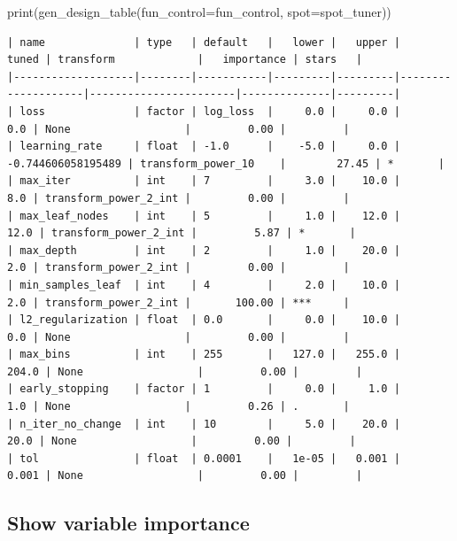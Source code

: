 \documentclass[
  letterpaper,
  DIV=11,
  numbers=noendperiod]{scrreprt}
\newenvironment{Shaded}{\begin{snugshade}}{\end{snugshade}}
\newcommand{\BuiltInTok}[1]{\textcolor[rgb]{0.00,0.23,0.31}{#1}}
\newcommand{\NormalTok}[1]{\textcolor[rgb]{0.00,0.23,0.31}{#1}}
\newcommand{\OperatorTok}[1]{\textcolor[rgb]{0.37,0.37,0.37}{#1}}
\begin{document}
\begin{Shaded}
\begin{Highlighting}[]
\BuiltInTok{print}\NormalTok{(gen\_design\_table(fun\_control}\OperatorTok{=}\NormalTok{fun\_control,}
\NormalTok{    spot}\OperatorTok{=}\NormalTok{spot\_tuner))}
\end{Highlighting}
\end{Shaded}

\begin{verbatim}
| name              | type   | default   |   lower |   upper |              tuned | transform             |   importance | stars   |
|-------------------|--------|-----------|---------|---------|--------------------|-----------------------|--------------|---------|
| loss              | factor | log_loss  |     0.0 |     0.0 |                0.0 | None                  |         0.00 |         |
| learning_rate     | float  | -1.0      |    -5.0 |     0.0 | -0.744606058195489 | transform_power_10    |        27.45 | *       |
| max_iter          | int    | 7         |     3.0 |    10.0 |                8.0 | transform_power_2_int |         0.00 |         |
| max_leaf_nodes    | int    | 5         |     1.0 |    12.0 |               12.0 | transform_power_2_int |         5.87 | *       |
| max_depth         | int    | 2         |     1.0 |    20.0 |                2.0 | transform_power_2_int |         0.00 |         |
| min_samples_leaf  | int    | 4         |     2.0 |    10.0 |                2.0 | transform_power_2_int |       100.00 | ***     |
| l2_regularization | float  | 0.0       |     0.0 |    10.0 |                0.0 | None                  |         0.00 |         |
| max_bins          | int    | 255       |   127.0 |   255.0 |              204.0 | None                  |         0.00 |         |
| early_stopping    | factor | 1         |     0.0 |     1.0 |                1.0 | None                  |         0.26 | .       |
| n_iter_no_change  | int    | 10        |     5.0 |    20.0 |               20.0 | None                  |         0.00 |         |
| tol               | float  | 0.0001    |   1e-05 |   0.001 |              0.001 | None                  |         0.00 |         |
\end{verbatim}

\hypertarget{show-variable-importance-2}{%
\subsection{Show variable importance}\label{show-variable-importance-2}}
\end{document}
